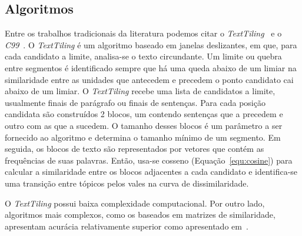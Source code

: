 
\subsection{Algoritmos}
	\label{subsec:principaisalgoritimos}



Entre os trabalhos tradicionais da literatura podemos citar o  \textit{TextTiling}~\cite{Hearst1994} e o \textit{C99}~\cite{Choi2000}. O \textit{TextTiling} é um algoritmo baseado em janelas deslizantes, em  que, para cada candidato a limite, analisa-se o texto circundante. Um limite ou quebra entre segmentos é identificado sempre que há uma queda abaixo de um limiar na similaridade entre as unidades que antecedem e precedem o ponto candidato cai abaixo de um limiar. O \textit{TextTiling} recebe uma lista de candidatos a limite, usualmente finais de parágrafo ou finais de sentenças. Para cada posição candidata são construídos 2 blocos, um contendo sentenças que a precedem e outro com as que a sucedem. O tamanho desses blocos é um parâmetro a ser fornecido ao algoritmo e determina o tamanho mínimo de um segmento. Em seguida, os blocos de texto são representados por vetores que contém as frequências de suas palavras. Então, usa-se cosseno (Equação~\ref{equ:cosine}) para calcular a similaridade entre os blocos adjacentes a cada candidato e identifica-se uma transição entre tópicos pelos vales na curva de dissimilaridade.

O \textit{TextTiling} possui baixa complexidade computacional. Por outro lado, algoritmos mais complexos, como os baseados em matrizes de similaridade, apresentam acurácia relativamente superior como apresentado em~\cite{Choi2000, Kern2009, Misra2009}.





